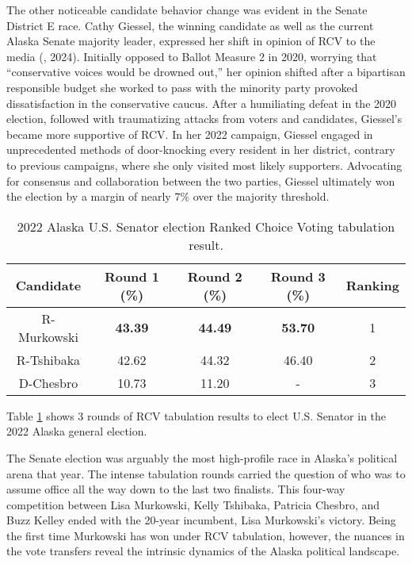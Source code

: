 \documentclass[12pt, a4paper, twoside]{article}
\begin{document}
The other noticeable candidate behavior change was evident in the Senate District E race. Cathy Giessel, the winning candidate as well as the current Alaska Senate majority leader, expressed her shift in opinion of RCV to the media (\cite{troiano2024}, 2024). Initially opposed to Ballot Measure 2 in 2020, worrying that “conservative voices would be drowned out,” her opinion shifted after a bipartisan responsible budget she worked to pass with the minority party provoked dissatisfaction in the conservative caucus. After a humiliating defeat in the 2020 election, followed with traumatizing attacks from voters and candidates, Giessel’s became more supportive of RCV. In her 2022 campaign, Giessel engaged in unprecedented methods of door-knocking every resident in her district, contrary to previous campaigns, where she only visited most likely supporters. Advocating for consensus and collaboration between the two parties, Giessel ultimately won the election by a margin of nearly 7\% over the majority threshold. 

\begin{table}[h]
\centering
\begin{tabular}{|c|c|c|c|c|}
\hline
Candidate & Round 1 (\%) & Round 2 (\%) & Round 3 (\%) & Ranking \\ \hline 
R-Murkowski & \textbf{43.39} & \textbf{44.49} & \textbf{53.70} & 1 \\ \hline
R-Tshibaka & 42.62 & 44.32 & 46.40 & 2 \\ \hline
D-Chesbro & 10.73 & 11.20 & - & 3 \\ \hline
\end{tabular}
\caption{2022 Alaska U.S. Senator election Ranked Choice Voting tabulation result.}
\label{tab:4}
\end{table}

Table \ref{tab:4} shows 3 rounds of RCV tabulation results to elect U.S. Senator in the 2022 Alaska general election.

The Senate election was arguably the most high-profile race in Alaska’s political arena that year. The intense tabulation rounds carried the question of who was to assume office all the way down to the last two finalists. This four-way competition between Lisa Murkowski, Kelly Tshibaka, Patricia Chesbro, and Buzz Kelley ended with the 20-year incumbent, Lisa Murkowski’s victory. Being the first time Murkowski has won under RCV tabulation, however, the nuances in the vote transfers reveal the intrinsic dynamics of the Alaska political landscape. 
\end{document}
